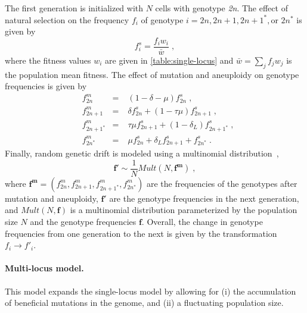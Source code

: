 \documentclass[12pt]{extarticle}
\let\vec\mathbf
\newcommand{\euwt}{\emph{2n}}
\begin{document}
The first generation is initialized with $N$ cells with genotype \euwt.
The effect of natural selection on the frequency $f_i$ of genotype $i = 2n, 2n+1, 2n+1^*, \text{or } 2n^*$ is given by
    \begin{equation} \label{eq:selection-single} 
      f^s_i = \frac{f_i w_i}{\bar{w}} \;,
    \end{equation}
where the fitness values $w_i$ are given in \autoref{table:single-locus} and $\bar{w} = \sum_{j}{f_j w_j}$ is the population mean fitness.
The effect of mutation and aneuploidy on genotype frequencies is given by
    \begin{equation} \label{eq:mutation-aneuploidy-single}
    \begin{aligned}
      &f^m_{2n} &=&\; (1 - \delta - \mu) f^s_{2n}  \;,\\
      &f^m_{2n+1} &=&\; \delta f^s_{2n} + (1 - \tau \mu) f^s_{2n+1}  \;,\\
      &f^m_{2n+1^*} &=&\; \tau \mu f^s_{2n+1} + (1-\delta_L) f^s_{2n+1^*}  \;,\\
      &f^m_{2n^*} &=&\; \mu f^s_{2n} + \delta_L f^s_{2n+1} + f^s_{2n^*}  \;.
    \end{aligned}
    \end{equation}
Finally, random genetic drift is modeled using a multinomial distribution~\citep{Otto2007},
    \begin{equation} \label{eq:drift-single}
      \vec{f'} \sim \frac{1}{N} Mult(N, \vec{f^m}) \;,
    \end{equation}
where $\vec{f^m}=(f^m_{2n},f^m_{2n+1},f^m_{2n+1^*},f^m_{2n^*})$ are the frequencies of the genotypes after mutation and aneuploidy, $\vec{f'}$ are the genotype frequencies in the next generation, and $Mult(N, \vec{f})$ is a multinomial distribution parameterized by the population size $N$ and the genotype frequencies $\vec{f}$.
Overall, the change in genotype frequencies from one generation to the next is given by the transformation $f_i \to f'_i$.

\paragraph*{Multi-locus model.}
This model expands the single-locus model by allowing for (i) the accumulation of beneficial mutations in the genome, and (ii) a fluctuating population size. 
\end{document}
